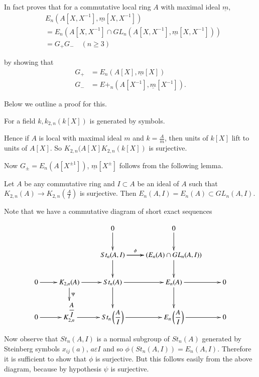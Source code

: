 \begin{rem}\label{c3:rem4.2}
In fact \citeauthor{Suslina} proves that for a commutative local ring $A$ with
maximal ideal $\underline{m}$,
\begin{align*}
&E_n\left(A\left[X,X^{-1}\right],\underline{m}\left[X,X^{-1}\right]\right)\\
&=E_n\left(A\left[X,X^{-1}\right]\cap
  GL_n\left(A\left[X,X^{-1}\right],\underline{m}\left[X,X^{-1}\right]\right)\right)\\
&=G_+G_{-}\quad (n\geq 3)
\end{align*}

by showing that 
$$
\begin{aligned}
G_+&=E_n(A[X],\underline{m}[X])\\
G_-&=E+_n\left(A\left[X^{-1}\right],\underline{m}\left[X^{-1}\right]\right).
\end{aligned}
$$

Below we outline a proof for this.

For a field $k,k_{2,n}(k[X])$ is generated by symbols.

Hence if $A$ is local with maximal ideal $m$ and $k=\frac{A}{m}$, then
units of $k[X]$ lift to units of $A[X]$. So
$K_{2,n}(A[X]K_{2,n}(k[X])$ is surjective.

Now $G_{\pm}=E_n\left(A\left[X^{\pm 1}\right]\right)$,
$\underline{m}\left[X^{\pm}\right]$ follows from the following lemma.
\end{rem}

\begin{lem}\label{c3:lem4.3}
Let $A$ be any commutative ring and $I\subset A$ be an ideal of $A$
such that $K_{2,n}(A)\rightarrow K_{2,n}\left(\frac{A}{I}\right)$ is
surjective. Then $E_n(A,I)=E_n(A)\subset GL_n(A,I)$.
\end{lem}

\begin{Proof}
Note that we have a commutative diagram of short exact sequences

$$
\xymatrix{
& & 0\ar[d]&0\ar[d]&\\
& &\ar[r]St_n(A,I)\ar[d]\ar[r]^-\phi&(E_n(A)\cap GL_n(A,I))\ar[d]&\\
0\ar[r]&K_{2,n}(A)\ar[d]^-{\Psi}\ar[r]&St_n(A)\ar[d]\ar[r]&E_n(A)\ar[d]\ar[r]&0\\
0\ar[r]&K_{2,n}^{\dfrac{A}{I}}\ar[r]&St_n\left(\dfrac{A}{I}\right)\ar[r]&
E_n\left(\dfrac{A}{I}\right)\ar[r]&0}
$$


Now observe that $St_n(A,I)$ is a normal subgroup of $St_n(A)$
generated by Steinberg symbols $x_{ij}(a)$, $a\varepsilon I$ and so
$\phi (St_n(A,I))=E_n(A,I)$. Therefore it is sufficient to show that
$\phi$ is surjective. But this follows easily from the above diagram,
because by hypothesis $\psi$ is surjective.
\enprf
\end{Proof}


